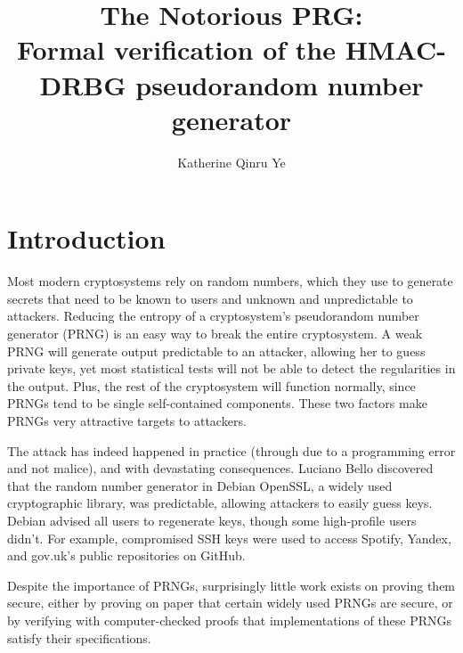 \documentclass[12pt,lot, lof]{puthesis}
\title{The Notorious \textsc{PRG}:\\
Formal verification of the \textsc{HMAC-DRBG} pseudorandom number generator}
\author{Katherine Qinru Ye}
\begin{document}
\makefrontmatter



% 
% 
% 
% 
% 
% 

\chapter{Introduction} \label{sec:introduction}

Most modern cryptosystems rely on random numbers, which they use to generate secrets that need to be known to users and unknown and unpredictable to attackers. Reducing the entropy of a cryptosystem's pseudorandom number generator (PRNG) is an easy way to break the entire cryptosystem. A weak PRNG will generate output predictable to an attacker, allowing her to guess private keys, yet most statistical tests will not be able to detect the regularities in the output. Plus, the rest of the cryptosystem will function normally, since PRNGs tend to be single self-contained components. These two factors make PRNGs very attractive targets to attackers. 

The attack has indeed happened in practice (through due to a programming error and not malice), and with devastating consequences. Luciano Bello discovered that the random number generator in Debian OpenSSL, a widely used cryptographic library, was predictable, allowing attackers to easily guess keys. Debian advised all users to regenerate keys, though some high-profile users didn't. For example, compromised SSH keys were used to access Spotify, Yandex, and gov.uk's public repositories on GitHub.

Despite the importance of PRNGs, surprisingly little work exists on proving them secure, either by proving on paper that certain widely used PRNGs are secure, or by verifying with computer-checked proofs that implementations of these PRNGs satisfy their specifications.

\end{document}
